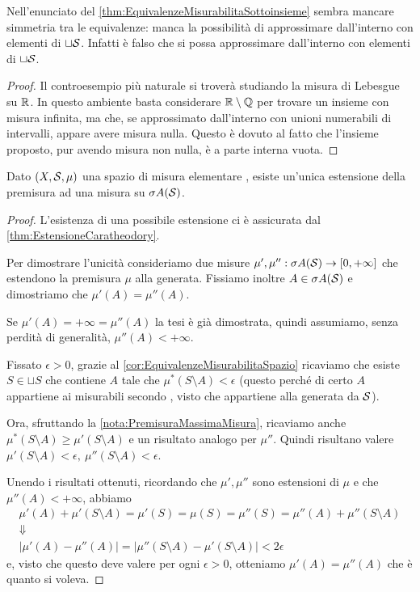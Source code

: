 \begin{remark}
	Nell'enunciato del \cref{thm:EquivalenzeMisurabilitaSottoinsieme} sembra mancare simmetria tra le equivalenze: manca la possibilità di approssimare dall'interno con elementi di $\sqcup\S$. Infatti è falso che si possa approssimare dall'interno con elementi di $\sqcup\S$.
\end{remark}
\begin{proof}
	Il controesempio più naturale si troverà studiando la misura di Lebesgue su $\R$. In questo ambiente basta considerare $\R\setminus\mathbb Q$ per trovare un insieme con misura infinita, ma che, se approssimato dall'interno con unioni numerabili di intervalli, appare avere misura nulla. Questo è dovuto al fatto che l'insieme proposto, pur avendo misura non nulla, è a parte interna vuota.
\end{proof}




\begin{proposition}\label{prop:UnicitaCaratheodory}
	Dato $(X,\S,\mu)$ una spazio di misura elementare \sigfin[o], esiste un'unica estensione della premisura ad una misura su $\sigma A(\S)$.
\end{proposition}
\begin{proof}
	L'esistenza di una possibile estensione ci è assicurata dal \cref{thm:EstensioneCaratheodory}.
	
	Per dimostrare l'unicità consideriamo due misure $\mu',\mu'':\sigma A(\S)\to\Rpiu$ che estendono la premisura $\mu$ alla \sigalg{} generata. Fissiamo inoltre $A\in\sigma A(\S)$ e dimostriamo che $\mu'(A)=\mu''(A)$.
	
	Se $\mu'(A)=+\infty=\mu''(A)$ la tesi è già dimostrata,  quindi assumiamo, senza perdità di generalità, $\mu''(A)<+\infty$.
	
	Fissato $\epsilon>0$, grazie al \cref{cor:EquivalenzeMisurabilitaSpazio} ricaviamo che esiste $S\in\sqcup S$ che contiene $A$ tale che $\mu^*(S\setminus A)< \epsilon$ (questo perché di certo $A$ appartiene ai misurabili secondo \carat{}, visto che appartiene alla \sigalg{} generata da $\S$).
	
	Ora, sfruttando la \cref{nota:PremisuraMassimaMisura}, ricaviamo anche $\mu^*(S\setminus A)\ge\mu'(S\setminus A)$ e un risultato analogo per $\mu''$. Quindi risultano valere $\mu'(S\setminus A)<\epsilon,\ \mu''(S\setminus A)<\epsilon$.
	
	Unendo i risultati ottenuti, ricordando che $\mu',\mu''$ sono estensioni di $\mu$ e che $\mu''(A)<+\infty$,  abbiamo
	\begin{gather*}
		\mu'(A)+\mu'(S\setminus A)=\mu'(S)=\mu(S)=\mu''(S)=\mu''(A)+\mu''(S\setminus A) \\
		\Downarrow \\
		\lvert\mu'(A)-\mu''(A)\rvert=\lvert\mu''(S\setminus A)-\mu'(S\setminus A)\rvert<2\epsilon
	\end{gather*}
	e, visto che questo deve valere per ogni $\epsilon>0$, otteniamo $\mu'(A)=\mu''(A)$ che è quanto si voleva.
\end{proof}

